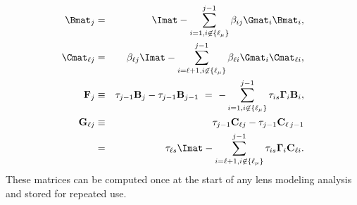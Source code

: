 \begin{eqnarray}
\Bmat_j &=& \Imat - \sum\limits_{i=1,i\not \in \{\ell_\mu\}}^{j-1}\beta_{ij}\Gmat_i \Bmat_i, \\
\Cmat_{\ell j} &=& \beta_{\ell j} \Imat - \sum\limits_{i=\ell+1, i\not\in\{\ell_\mu\}}^{j-1} \beta_{\ell i}\Gmat_i\Cmat_{\ell i}, \\
\mathbf{F}_j &\equiv& \tau_{j-1} \mathbf{B}_{j}-\tau_{j-1} \mathbf{B}_{j-1}
  \ =\ - \sum\limits_{i=1,i\not \in \{\ell_\mu\}}^{j-1} \tau_{is}\mathbf{\Gamma}_i\mathbf{B}_i, \\
\mathbf{G}_{\ell j}&\equiv& \tau_{j-1} \mathbf{C}_{\ell j}-\tau_{j-1} \mathbf{C}_{\ell \,j-1}
  \nonumber \\
   &=&\ \tau_{\ell s}\Imat- \sum\limits_{i=\ell+1,i \not \in \{\ell_\mu\}}^{j-1} \tau_{is}\mathbf{\Gamma}_i\mathbf{C}_{\ell i}.
\end{eqnarray}
These matrices can be computed once at the start of any lens modeling analysis and stored for repeated use.